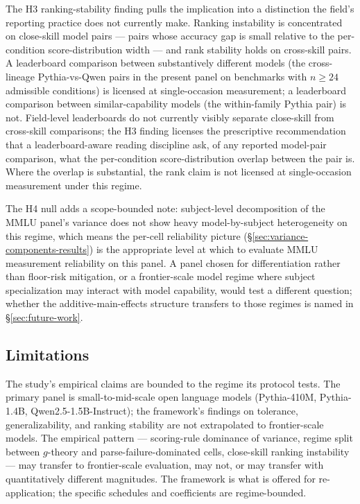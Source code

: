 \documentclass[11pt]{article}
\begin{document}
The H3 ranking-stability finding pulls the implication into a distinction the field's reporting practice does not currently make. Ranking instability is concentrated on close-skill model pairs --- pairs whose accuracy gap is small relative to the per-condition score-distribution width --- and rank stability holds on cross-skill pairs. A leaderboard comparison between substantively different models (the cross-lineage Pythia-vs-Qwen pairs in the present panel on benchmarks with $n \geq 24$ admissible conditions) is licensed at single-occasion measurement; a leaderboard comparison between similar-capability models (the within-family Pythia pair) is not. Field-level leaderboards do not currently visibly separate close-skill from cross-skill comparisons; the H3 finding licenses the prescriptive recommendation that a leaderboard-aware reading discipline ask, of any reported model-pair comparison, what the per-condition score-distribution overlap between the pair is. Where the overlap is substantial, the rank claim is not licensed at single-occasion measurement under this regime.

The H4 null adds a scope-bounded note: subject-level decomposition of the MMLU panel's variance does not show heavy model-by-subject heterogeneity on this regime, which means the per-cell reliability picture (§\ref{sec:variance-components-results}) is the appropriate level at which to evaluate MMLU measurement reliability on this panel. A panel chosen for differentiation rather than floor-risk mitigation, or a frontier-scale model regime where subject specialization may interact with model capability, would test a different question; whether the additive-main-effects structure transfers to those regimes is named in §\ref{sec:future-work}.

\subsection{Limitations}
\label{sec:limitations}

The study's empirical claims are bounded to the regime its protocol tests. The primary panel is small-to-mid-scale open language models (Pythia-410M, Pythia-1.4B, Qwen2.5-1.5B-Instruct); the framework's findings on tolerance, generalizability, and ranking stability are not extrapolated to frontier-scale models. The empirical pattern --- scoring-rule dominance of variance, regime split between $g$-theory and parse-failure-dominated cells, close-skill ranking instability --- may transfer to frontier-scale evaluation, may not, or may transfer with quantitatively different magnitudes. The framework is what is offered for re-application; the specific schedules and coefficients are regime-bounded.
\end{document}
